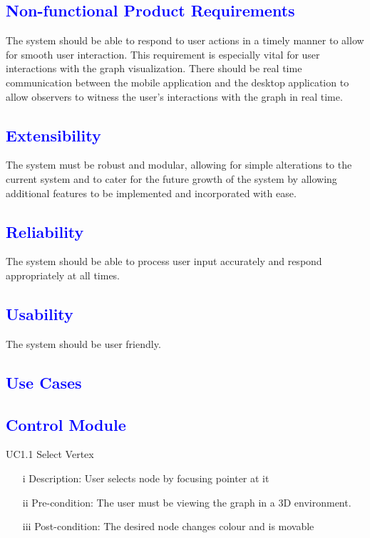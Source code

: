\documentclass[12pt]{article}
\begin{document}
\textcolor{blue}{\section{Non-functional Product Requirements}}
\begin{flushleft}
The system should be able to respond to user actions in a timely manner to allow for smooth user interaction. This requirement is especially vital for user interactions with the graph visualization. There should be real time communication between the mobile application and the desktop application to allow observers to witness the user’s interactions with the graph in real time.

\bigskip

\textcolor{blue}{\subsection{Extensibility}}
The system must be robust and modular, allowing for simple alterations to the current system and to cater for the future growth of the system by allowing additional features to be implemented and incorporated with ease.

\bigskip

\textcolor{blue}{\subsection{Reliability}}
The system should be able to process user input accurately and respond appropriately at all times.

\bigskip

\textcolor{blue}{\subsection{Usability}}
The system should be user friendly. 

\end{flushleft}

\textcolor{blue}{\section{Use Cases}}
\textcolor{blue}{\subsection{Control Module}}

\begin{flushleft}
UC1.1 Select Vertex
\begin{itemize}
\item[i] Description: User selects node by focusing pointer at it 
\item[ii] Pre-condition: The user must be viewing the graph in a 3D environment.
\item[iii] Post-condition: The desired node changes colour and is movable 
\end{itemize}
\end{flushleft}
\end{document}
